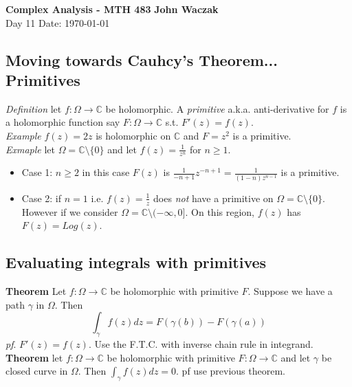 \documentclass[a4paper, 11pt]{article}
\begin{document}
\noindent
\large\textbf{Complex Analysis - MTH 483} \hfill \textbf{John Waczak} \\
\normalsize Day 11 \hfill  Date: \today \\

\subsection*{Moving towards Cauhcy's Theorem... Primitives}
	\textit{Definition} let $f:\Omega\rightarrow\mathbb{C}$ be holomorphic. A \textit{primitive} a.k.a. anti-derivative for $f$ is a holomorphic function say $F:\Omega \rightarrow\mathbb{C}$ s.t. $F'(z) = f(z)$. \\
	
	\noindent\textit{Example} $f(z)=2z$ is holomorphic on $\mathbb{C}$ and $F=z^2$ is a primitive. \\ 
	
	\noindent\textit{Exmaple} let $\Omega = \mathbb{C}\setminus\{0\}$ and let $f(z)=\frac{1}{z^n}$ for $n\geq1$. 
		\begin{itemize}
			\item Case 1: $n\geq 2$ in this case $F(z)$ is $\frac{1}{-n+1}z^{-n+1} = \frac{1}{(1-n)z^{n-1}}$ is a primitive. 
			
			\item Case 2: if $n=1$ i.e. $f(z)=\frac{1}{z}$ does \textit{not} have a primitive on $\Omega = \mathbb{C}\setminus\{0\}$. However if we consider $\Omega=\mathbb{C}\setminus(-\infty, 0]$. On this region, $f(z)$ has $F(z)=Log(z)$. 
		\end{itemize}



\subsection*{Evaluating integrals with primitives}
	\textbf{Theorem} Let $f:\Omega \rightarrow\mathbb{C}$ be holomorphic with primitive $F$. Suppose we have a path $\gamma$ in $\Omega$. Then 
		\begin{equation*}
			\int_{\gamma} f(z)dz = F(\gamma(b))-F(\gamma(a))
		\end{equation*}
	\noindent \textit{pf}. $F'(z)=f(z)$. Use the F.T.C. with inverse chain rule in integrand. \\ 
	
	\noindent \textbf{Theorem} let $f:\Omega \rightarrow \mathbb{C}$ be holomorphic with primitive $F:\Omega\rightarrow\mathbb{C}$ and let $\gamma$ be closed curve in $\Omega$. Then $\int_\gamma f(z)dz = 0 $. pf use previous theorem. \\ 
	
\end{document}
